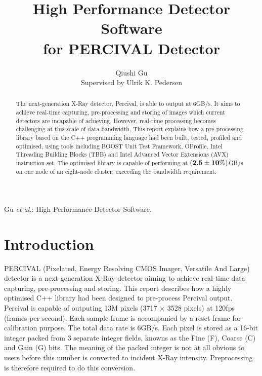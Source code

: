 \documentclass[journal]{IEEEtran}
\begin{document}
\title{High Performance Detector Software\\
for PERCIVAL Detector}

\author{Qiushi Gu \\Supervised by Ulrik K. Pedersen}

%
{Gu \MakeLowercase{\textit{et al.}}: High Performance Detector Software.}

\maketitle

\begin{abstract}
The next-generation X-Ray detector, Percival, is able to output at 6GB/s. It aims to achieve real-time capturing, pre-processing and storing of images which current detectors are incapable of achieving. However, real-time processing becomes challenging at this scale of data bandwidth. This report explains how a pre-processing library based on the C++ programming language had been built, tested, profiled and optimised, using tools including BOOST Unit Test Framework, OProfile, Intel Threading Building Blocks (TBB) and Intel Advanced Vector Extensions (AVX) instruction set. The optimised library is capable of performing at $\bf{(2.5\pm10\%)}$GB/s on one node of an eight-node cluster, exceeding the bandwidth requirement. 
\end{abstract}

\section{Introduction}

 PERCIVAL\cite{wunderer2014percival} (Pixelated, Energy Resolving CMOS Imager, Versatile And Large) detector is a next-generation X-Ray detector aiming to achieve real-time data capturing, pre-processing and storing. This report describes how a highly optimised C++ library had been designed to pre-process Percival output. \\ 
Percival is capable of outputing \texttildelow 13M pixels (3717 $\times$ 3528 pixels) at 120fps (frames per second). Each sample frame is accompanied by a reset frame for calibration purpose. The total data rate is \texttildelow 6GB/s. Each pixel is stored as a 16-bit integer packed from 3 separate integer fields, knowns as the Fine (F), Coarse (C) and Gain (G) bits. The meaning of the packed integer is not at all obvious to users before this number is converted to incident X-Ray intensity. Preprocessing is therefore required to do this conversion.
\end{document}

